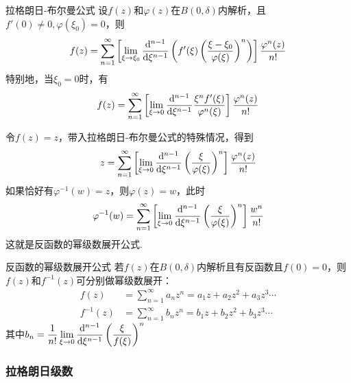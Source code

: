 \documentclass[main.tex]{subfiles}
\begin{document}
\begin{theorem}{拉格朗日-布尔曼公式}
    设\(f(z)\)和\(\varphi(z)\)在\(B(0,\delta)\)内解析，且\(f'(0) \neq 0, \varphi(\xi_0) = 0\)，则
    \[f(z) = \sum_{n=1}^{\infty}\left[\lim_{\xi \to \xi_0}\frac{{\rm d}^{n-1}}{{\rm d}\xi^{n-1}}\left(f'(\xi)\left(\frac{\xi-\xi_0}{\varphi(\xi)}\right)^n\right)\right]\frac{\varphi^n(z)}{n!}\]
    特别地，当\(\xi_0=0\)时，有
    \[f(z) = \sum_{n=1}^{\infty}\left[\lim_{\xi \to 0}\frac{{\rm d}^{n-1}}{{\rm d}\xi^{n-1}}\frac{\xi^nf'(\xi)}{\varphi^n(\xi)} \right]\frac{\varphi^n(z)}{n!}\]
\end{theorem}

令\(f(z)=z\)，带入拉格朗日-布尔曼公式的特殊情况，得到
\[z = \sum_{n=1}^{\infty}\left[\lim_{\xi \to 0}\frac{{\rm d}^{n-1}}{{\rm d}\xi^{n-1}}\left(\frac{\xi}{\varphi(\xi)}\right)^n \right]\frac{\varphi^n(z)}{n!}\]
如果恰好有\(\varphi^{-1}(w)=z\)，则\(\varphi(z)=w\)，此时
\[\varphi^{-1}(w) = \sum_{n=1}^{\infty}\left[\lim_{\xi \to 0}\frac{{\rm d}^{n-1}}{{\rm d}\xi^{n-1}}\left(\frac{\xi}{\varphi(\xi)}\right)^n \right]\frac{w^n}{n!}\]
这就是反函数的幂级数展开公式.

\begin{corollary}{反函数的幂级数展开公式}
    若\(f(z)\)在\(B(0,\delta)\)内解析且有反函数且\(f(0)=0\)，则\(f(z)\)和\(f^{-1}(z)\)可分别做幂级数展开：
    \begin{align*}
        f(z) &= \sum_{n=1}^{\infty} a_nz^n = a_1z + a_2z^2 + a_3z^3\cdots \\
        f^{-1}(z) &= \sum_{n=1}^{\infty} b_nz^n = b_1z + b_2z^2 + b_3z^3\cdots
    \end{align*}
    其中\(\displaystyle{b_n = \frac{1}{n!}\lim_{\xi \to 0}\frac{{\rm d}^{n-1}}{{\rm d}\xi^{n-1}}\left(\frac{\xi}{f(\xi)}\right)^n}\)
\end{corollary}

\subsubsection{拉格朗日级数}
\end{document}
